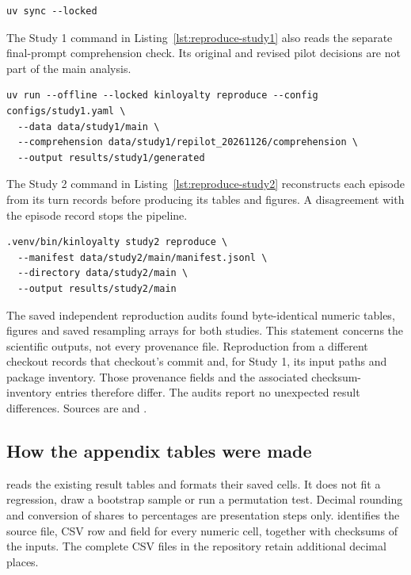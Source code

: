 \begin{lstlisting}[caption={Installation of the locked study environment.},label={lst:install}]
uv sync --locked
\end{lstlisting}

The Study 1 command in Listing~\ref{lst:reproduce-study1} also reads the separate final-prompt comprehension check. Its original and revised pilot decisions are not part of the main analysis.
\begin{lstlisting}[caption={Registered Study 1 reproduction command.},label={lst:reproduce-study1}]
uv run --offline --locked kinloyalty reproduce --config configs/study1.yaml \
  --data data/study1/main \
  --comprehension data/study1/repilot_20261126/comprehension \
  --output results/study1/generated
\end{lstlisting}

The Study 2 command in Listing~\ref{lst:reproduce-study2} reconstructs each episode from its turn records before producing its tables and figures. A disagreement with the episode record stops the pipeline.
\begin{lstlisting}[caption={Registered Study 2 reproduction command.},label={lst:reproduce-study2}]
.venv/bin/kinloyalty study2 reproduce \
  --manifest data/study2/main/manifest.jsonl \
  --directory data/study2/main \
  --output results/study2/main
\end{lstlisting}

The saved independent reproduction audits found byte-identical numeric tables, figures and saved resampling arrays for both studies. This statement concerns the scientific outputs, not every provenance file. Reproduction from a different checkout records that checkout's commit and, for Study 1, its input paths and package inventory. Those provenance fields and the associated checksum-inventory entries therefore differ. The audits report no unexpected result differences. Sources are  and .

\subsection{How the appendix tables were made}
\label{subapp:how-the-appendix-tables-were-made}
 reads the existing result tables and formats their saved cells. It does not fit a regression, draw a bootstrap sample or run a permutation test. Decimal rounding and conversion of shares to percentages are presentation steps only.  identifies the source file, CSV row and field for every numeric cell, together with checksums of the inputs. The complete CSV files in the repository retain additional decimal places.

